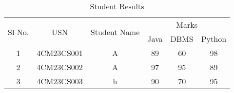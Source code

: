 \documentclass{article}
\begin{document}
	\begin{table}
		\caption{Student Results}
		\centering
		\begin{tabular}{|c|c|c|c|c|c|}
			\hline
			\multirow{2}{*}{Sl No.} & \multirow{2}{*}{USN} & \multirow{2}{*}{Student Name} & \multicolumn{3}{|c|}{Marks} \\
			\cline{4-6} &&& Java & DBMS & Python \\
			\hline
			1 & 4CM23CS001 & A & 89 & 60 & 98 \\
			\hline
			2 & 4CM23CS002 & A & 97 & 95 & 89 \\
			\hline
			3 & 4CM23CS003 & h & 90 & 70 & 95 \\
			\hline
		\end{tabular}
	\end{table}
\end{document}
